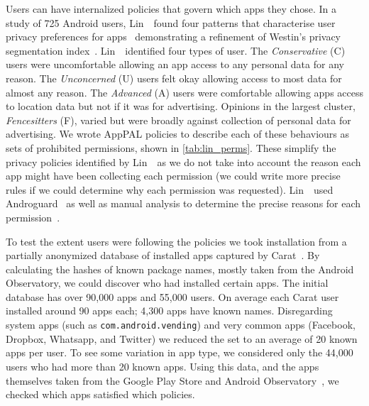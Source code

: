 \documentclass[thesis.tex]{subfiles}
\begin{document}
Users can have internalized policies that govern which apps they chose.
In a study of 725 Android users, Lin~\etal~found four patterns that characterise user privacy preferences for apps~\cite{lin_modeling_2014} demonstrating a refinement of Westin's privacy segmentation index~\cite{harris_interactive_privacy_2002}.
Lin~\etal~identified four types of user.
The \emph{Conservative} (C) users were uncomfortable allowing an app access to any personal data for any reason.
The \emph{Unconcerned} (U) users felt okay allowing access to most data for almost any reason.
The \emph{Advanced} (A) users were comfortable allowing apps access to location data but not if it was for advertising.
Opinions in the largest cluster, \emph{Fencesitters} (F), varied but were broadly against collection of personal data for advertising.
We wrote AppPAL policies to describe each of these behaviours as sets of prohibited permissions, shown in \autoref{tab:lin_perms}.
These simplify the privacy policies identified by Lin~\etal~as we do not take into account the reason each app might have been collecting each permission
(we could write more precise rules if we could determine why each permission was requested).
Lin~\etal~used Androguard~\cite{andrew_desnos_androguard_2012} as well as manual analysis to determine the precise reasons for each permission~\cite{lin_modeling_2014}.

To test the extent users were following the policies we took installation from a partially anonymized database of installed apps captured by Carat~\cite{oliner_carat:_2013}.
By calculating the hashes of known package names, mostly taken from the Android Observatory, we could discover who had installed certain apps.
The initial database has over 90,000 apps and 55,000 users.
On average each Carat user installed around 90 apps each; 4,300 apps have known names.
Disregarding system apps (such as \texttt{com.android.vending}) and very common apps (Facebook, Dropbox, Whatsapp, and Twitter) we reduced the set to an average of 20 known apps per user.
To see some variation in app type, we considered only the 44,000 users who had more than 20 known apps.
Using this data, and the apps themselves taken from the Google Play Store and Android Observatory~\cite{barrera_understanding_2012}, we checked which apps satisfied which policies.
\end{document}
